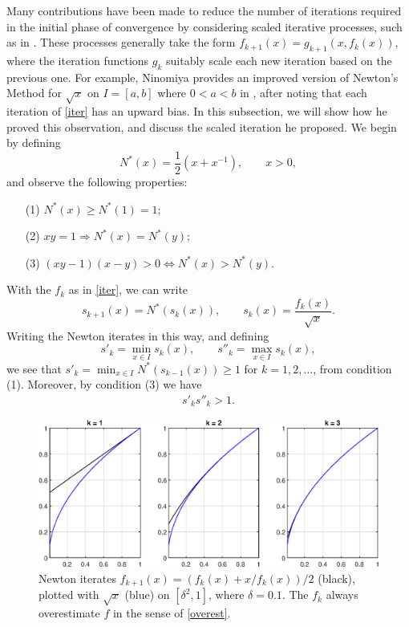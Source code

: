 \bigskip{}

Many contributions have been made to reduce the number of iterations required in the initial phase of convergence by considering scaled iterative processes, such as in \cite{ninomiya1970best,Rutishauser}. These processes generally take the form $f_{k+1}(x)=g_{k+1}(x,f_k(x))$, where the iteration functions $g_k$ suitably scale each new iteration based on the previous one. For example, Ninomiya provides an improved version of Newton's Method for $\sqrt{x}$ on $I=[a,b]$ where $0<a<b$ in \cite{ninomiya1970best}, after noting that each iteration of \eqref{iter} has an upward bias. In this subsection, we will show how he proved this observation, and discuss the scaled iteration he proposed. We begin by defining
\[N^*(x)=\dfrac{1}{2}(x+x^{-1}), \qquad x>0,\]
and observe the following properties:
\begin{enumerate}
    \item[(1)] $N^*(x) \geq N^*(1) = 1$;
    \item[(2)] $xy=1 \Longrightarrow N^*(x)=N^*(y)$;
    \item[(3)] $(xy-1)(x-y)>0 \Longleftrightarrow N^*(x)>N^*(y)$.
\end{enumerate}
With the $f_k$ as in \eqref{iter}, we can write
\[s_{k+1}(x) = N^*(s_k(x)), \qquad s_k(x)=\dfrac{f_k(x)}{\sqrt{x}}.\]
Writing the Newton iterates in this way, and defining
\[s'_k=\min_{x\in I} s_k(x), \qquad s''_k=\max_{x\in I} s_k(x),\]
we see that $s'_k = \min_{x\in I} N^*(s_{k-1}(x)) \geq 1$ for $k=1,2,\dots$, from condition (1). Moreover, by condition (3) we have
\begin{align}
    s'_k s''_k >1. \label{overest}
\end{align}

\begin{figure}[t!]
\centering
   \includegraphics[width=\textwidth,height=\textheight,keepaspectratio]{figures/chapter_2/Newton_overshoot.eps}
   \caption{Newton iterates $f_{k+1}(x)=(f_k(x)+x/f_k(x))/2$ (black), plotted with $\sqrt{x}$ (blue) on $[\delta^2,1]$, where $\delta=0.1$. The $f_k$ always overestimate $f$ in the sense of \eqref{overest}.}
   \label{fig:overshootnewton}
\end{figure}

